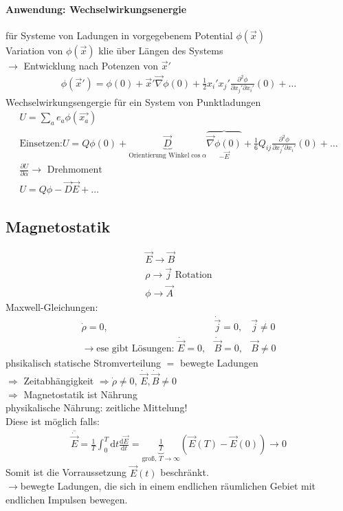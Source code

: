 \documentclass[a4paper]{article}
\begin{document}
\paragraph{Anwendung: Wechselwirkungsenergie}
für Systeme von Ladungen in vorgegebenem Potential $\phi(\vec{x})$\\
Variation von $\phi(\vec{x})$ klie über Längen des Systems\\
$\rightarrow$ Entwicklung nach Potenzen von $\vec{x}'$\\
\begin{align}
\phi(\vec{x}')=\phi(0)+\vec{x}'\vec{\nabla}\phi(0)+\frac{1}{2}x_i'x_j'
\frac{\partial^2\phi}{\partial x_j'\partial x_i'}(0)+\ldots
\end{align}
Wechselwirkungsengergie für ein System von Punktladungen
\begin{align}
U=\sum_a e_a\phi(\vec{x_a})\\
\text{Einsetzen:}
U=Q\phi(0)+\underbrace{\vec{D}}_{\text{Orientierung Winkel}\cos\alpha}
\overbrace{\vec{\nabla}\phi(0)}_{-\vec{E}}+ \frac{1}{6}Q_{ij}\frac{\partial^2\phi}{\partial x_j'\partial x_i'}(0)+\ldots\\
\frac{\partial U}{\partial\alpha}\rightarrow \text{ Drehmoment}\\
U=Q\phi-\vec{D}\vec{E}+\ldots
\end{align}
\subsection{Magnetostatik}
\begin{align}
\vec{E}\rightarrow\vec{B}\\
\rho\rightarrow\vec{j} \text{    Rotation}\\
\phi\rightarrow\vec{A}
\end{align}
Maxwell-Gleichungen:
\begin{align}
\dot{\rho}=0, & \dot{\vec{j}}=0, & \vec{j}\neq0\\
\rightarrow \text{ese gibt Lösungen: } \dot{\vec{E}}=0, &\dot{\vec{B}}=0,
&\vec{B}\neq0
\end{align}
phsikalisch statische Stromverteilung $=$ bewegte Ladungen\\
$\Rightarrow$ Zeitabhängigkeit $\Rightarrow \dot{\rho}\neq0$, 
$\dot{\vec{E}},\dot{\vec{B}}\neq0$\\
$\Rightarrow$ Magnetostatik ist Nährung\\
physikalische Nährung: zeitliche Mittelung!\\
Diese ist möglich falls:
\begin{align}
\overline{\dot{\vec{E}}}=\frac{1}{T}\int_0^T \mathrm{d}t
\frac{\mathrm{d}\vec{E}}{\mathrm{d}t}=\underbrace{\frac{1}{T}}_{\text{groß, }T\rightarrow\infty}
\left( \vec{E}(T)-\vec{E}(0) \right)\rightarrow0
\end{align}
Somit ist die Vorraussetzung $\vec{E}(t)$ beschränkt.\\
$\rightarrow$bewegte Ladungen, die sich in einem endlichen räumlichen Gebiet mit
endlichen Impulsen bewegen.
\end{document}
